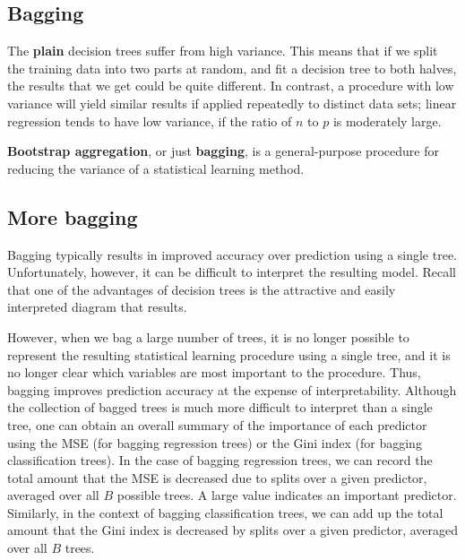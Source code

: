 \documentclass[%
oneside,                 %
final,                   %
10pt]{article}
\begin{document}
\subsection*{Bagging}

The \textbf{plain} decision trees suffer from high
variance. This means that if we split the training data into two parts
at random, and fit a decision tree to both halves, the results that we
get could be quite different. In contrast, a procedure with low
variance will yield similar results if applied repeatedly to distinct
data sets; linear regression tends to have low variance, if the ratio
of $n$ to $p$ is moderately large. 

\textbf{Bootstrap aggregation}, or just \textbf{bagging}, is a
general-purpose procedure for reducing the variance of a statistical
learning method. 


\subsection*{More bagging}

Bagging typically results in improved accuracy
over prediction using a single tree. Unfortunately, however, it can be
difficult to interpret the resulting model. Recall that one of the
advantages of decision trees is the attractive and easily interpreted
diagram that results.

However, when we bag a large number of trees, it is no longer
possible to represent the resulting statistical learning procedure
using a single tree, and it is no longer clear which variables are
most important to the procedure. Thus, bagging improves prediction
accuracy at the expense of interpretability.  Although the collection
of bagged trees is much more difficult to interpret than a single
tree, one can obtain an overall summary of the importance of each
predictor using the MSE (for bagging regression trees) or the Gini
index (for bagging classification trees). In the case of bagging
regression trees, we can record the total amount that the MSE is
decreased due to splits over a given predictor, averaged over all $B$ possible
trees. A large value indicates an important predictor. Similarly, in
the context of bagging classification trees, we can add up the total
amount that the Gini index  is decreased by splits over a given
predictor, averaged over all $B$ trees.

\end{document}
